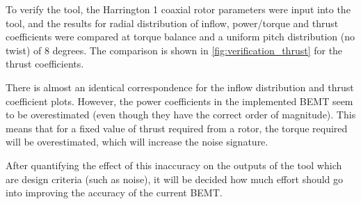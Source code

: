 To verify the tool, the Harrington 1 coaxial rotor parameters were input into the tool, and the results for radial distribution of inflow, power/torque and thrust coefficients were compared at torque balance and a uniform pitch distribution (no twist) of 8 degrees. The comparison is shown in  \autoref{fig:verification_thrust} for the thrust coefficients. 

There is almost an identical correspondence for the inflow distribution and thrust coefficient plots. However, the power coefficients in the implemented BEMT seem to be overestimated (even though they have the correct order of magnitude). This means that for a fixed value of thrust required from a rotor, the torque required will be overestimated, which will increase the noise signature.

After quantifying the effect of this inaccuracy on the outputs of the tool which are design criteria (such as noise), it will be decided how much effort should go into improving the accuracy of the current BEMT.

